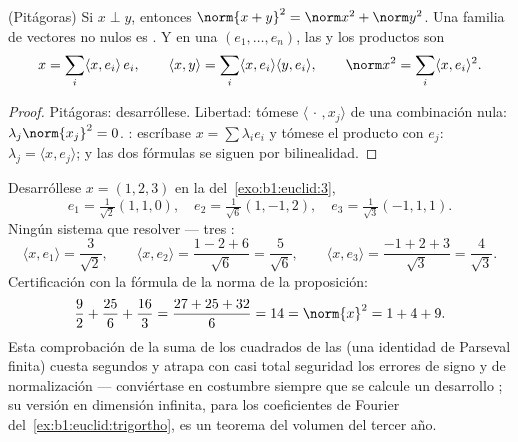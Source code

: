 \begin{proposition}\label{prop:b1:euclid:orthfree}
(Pitágoras) Si $x \perp y$, entonces
$\norm{x+y}^2 = \norm x^2 + \norm y^2$. Una familia  de
vectores no nulos es . Y en una  
$(e_1, \dots, e_n)$, las  y los productos son
\[
x = \sum_{i} \langle x, e_i\rangle\, e_i,
\qquad
\langle x, y \rangle = \sum_i \langle x, e_i\rangle \langle y,
e_i\rangle,
\qquad
\norm x^2 = \sum_i \langle x, e_i\rangle^2 .
\]
\end{proposition}

\begin{proof}
Pitágoras: desarróllese. Libertad: tómese
$\langle\,\cdot\,, x_j\rangle$ de una combinación nula:
$\lambda_j \norm{x_j}^2 = 0$. : escríbase
$x = \sum \lambda_i e_i$ y tómese el producto con $e_j$:
$\lambda_j = \langle x, e_j\rangle$; y las dos fórmulas se siguen por
bilinealidad.
\end{proof}

\begin{example}
\label{ex:b1:euclid:parsevalcheck}
Desarróllese $x = (1, 2, 3)$ en la  
del~\cref{exo:b1:euclid:3},
\[
e_1 = \tfrac{1}{\sqrt2}(1,1,0), \quad
e_2 = \tfrac{1}{\sqrt6}(1,-1,2), \quad
e_3 = \tfrac{1}{\sqrt3}(-1,1,1).
\]
Ningún sistema que resolver --- tres :
\[
\langle x, e_1\rangle = \frac{3}{\sqrt2},
\qquad
\langle x, e_2\rangle = \frac{1 - 2 + 6}{\sqrt6} =
\frac{5}{\sqrt6},
\qquad
\langle x, e_3\rangle = \frac{-1 + 2 + 3}{\sqrt3} =
\frac{4}{\sqrt3}.
\]
Certificación con la fórmula de la norma de la proposición:
\[
\frac{9}{2} + \frac{25}{6} + \frac{16}{3}
= \frac{27 + 25 + 32}{6} = 14 = \norm{x}^2 = 1 + 4 + 9 .
\]
Esta comprobación de la suma de los cuadrados de las  (una
identidad de Parseval finita) cuesta segundos y atrapa con casi total
seguridad los errores de signo y de normalización --- conviértase en
costumbre siempre que se calcule un desarrollo ; su
versión en dimensión infinita, para los coeficientes de Fourier
del~\cref{ex:b1:euclid:trigortho}, es un teorema del volumen del
tercer año.
\end{example}

